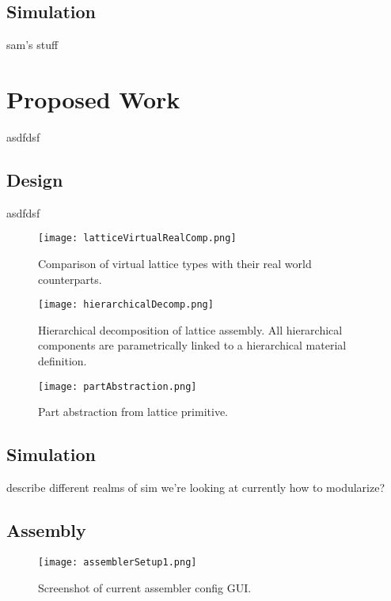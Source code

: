 \subsection{Simulation}

sam's stuff

\section{Proposed Work}

asdfdsf

\subsection{Design}

asdfdsf

\begin{figure}
  \texttt{[image: latticeVirtualRealComp.png]}
  \caption{Comparison of virtual lattice types with their real world counterparts.}
  \label{fig: latticeVirtualRealComp}
\end{figure}

\begin{figure}
  \texttt{[image: hierarchicalDecomp.png]}
  \caption{Hierarchical decomposition of lattice assembly. All hierarchical components are parametrically linked to a hierarchical material definition.}
  \label{fig:hierarchicalDecomp}
\end{figure}

\begin{figure}
  \texttt{[image: partAbstraction.png]}
  \caption{Part abstraction from lattice primitive.}
  \label{fig: partAbstraction}
\end{figure}

\subsection{Simulation}

describe different realms of sim we're looking at currently
how to modularize?

\subsection{Assembly}

\begin{figure}
  \texttt{[image: assemblerSetup1.png]}
  \caption{Screenshot of current assembler config GUI.}
  \label{fig: assembleSetup1}
\end{figure}

